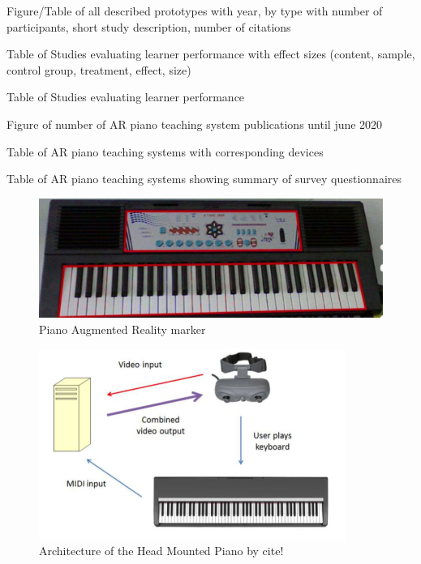 \documentclass[manuscript,screen]{acmart}
\begin{document}
Figure/Table of all described prototypes with year, by type with number of participants, short study description, number of citations

Table of Studies evaluating learner performance with effect sizes (content, sample, control group, treatment, effect, size)

Table of Studies evaluating learner performance 

Figure of number of AR piano teaching system publications until june 2020

Table of AR piano teaching systems with corresponding devices 

Table of AR piano teaching systems showing summary of survey
questionnaires

\begin{figure}
    \centering
    \includegraphics[width=15cm]{figures/pianomarker.png}
    \caption{Piano Augmented Reality marker}
    \label{fig:pianomarker}
\end{figure}

\begin{figure}
    \centering
    \includegraphics[width=10cm]{figures/headmountedpiano1.png}
    \caption{Architecture of the Head Mounted Piano by cite! }
    \label{fig:pianoheadmountedarch}
\end{figure}
\end{document}
